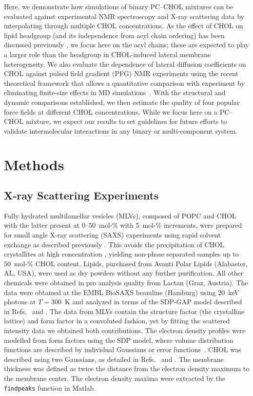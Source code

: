 \documentclass[journal=jctcce]{achemso}
\begin{document}
Here, we demonstrate how simulations of binary PC--CHOL mixtures can be evaluated against experimental NMR spectroscopy and X-ray scattering data by interpolating through multiple CHOL concentrations. As the effect of CHOL on lipid headgroup (and its independence from acyl chain ordering) has been discussed previously \cite{botan15,antila22b}, we focus here on the acyl chains; these are expected to play a larger role than the headgroup in CHOL-induced lateral membrane heterogeneity. We also evaluate the dependence of lateral diffusion coefficients on CHOL against pulsed field gradient (PFG) NMR experiments \cite{filippov2003effect,filippov2003influence} using the recent theoretical framework that allows a quantitative comparison with experiment by eliminating finite-size effects in MD simulations~\cite{vogele2016divergent,vogele2018hydrodynamics}. With the structural and dynamic comparisons established, we then estimate the quality of four popular force fields at different CHOL concentrations. While we focus here on a PC--CHOL mixture, we expect our results to set guidelines for future efforts to validate intermolecular interactions in any binary or multi-component system. 

\section{Methods}

\subsection{X-ray Scattering Experiments}

Fully hydrated multilamellar vesicles (MLVs), composed of POPC and CHOL with the latter present at 0--50~mol-\% with 5~mol-\% increments, were prepared for small angle X-ray scattering (SAXS) experiments using rapid solvent exchange as described previously \cite{rieder2015optimizing,belivcka2017high}. This avoids the precipitation of CHOL crystallites at high concentration \cite{buboltz1999novel}, yielding non-phase separated samples up to 50~mol-\% CHOL content. Lipids, purchased from Avanti Polar Lipids (Alabaster, AL, USA), were used as dry powders without any further purification. All other chemicals were obtained in pro analysis quality from Lactan (Graz, Austria). The data were obtained at the EMBL BioSAXS beamline (Hamburg) using 20~keV photons at $T=300$~K and analyzed in terms of the SDP-GAP model described in Refs.~ and . The data from MLVs contain the structure factor (the crystalline lattice) and form factor in a convoluted fashion, yet by fitting the scattered intensity data we obtained both contributions. The electron density profiles were modelled from form factors using the SDP model, where volume distribution functions are described by individual Gaussians or error functions~\cite{heberle12,Kucerka08a,kucerka12}. CHOL was described using two Gaussians, as detailed in Refs.~ and . The membrane thickness was defined as twice the distance from the electron density maximum to the membrane center. The electron density maxima were extracted by the \texttt{findpeaks} function in Matlab.
\end{document}
